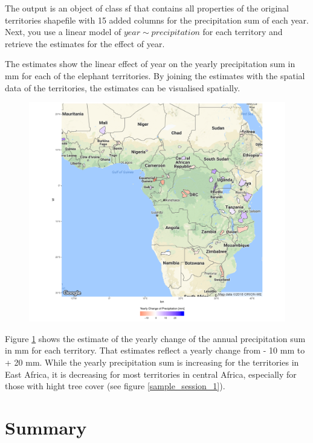 The output is an object of class sf that contains all properties of the original territories shapefile with 15 added columns for the precipitation sum of each year.
Next, you use a linear model of $year  \sim precipitation$ for each territory and retrieve the estimates for the effect of year. 

The estimates show the linear effect of year on the yearly precipitation sum in mm for each of the elephant territories. 
By joining the estimates with the spatial data of the territories, the estimates can be visualised spatially. 

\begin{center}
	\begin{figure}[h]
		\begin{center}
			\includegraphics[width=16cm]{images/change_precipitation.pdf}
			\label{change}
		\end{center}
	\end{figure}
\end{center}


Figure \ref{change} shows the estimate of the yearly change of the annual precipitation sum in mm for each territory. That estimates reflect a yearly change from - 10 mm to + 20 mm. While the yearly precipitation sum is increasing for the territories in East Africa, it is decreasing for most territories in central Africa, especially for those with hight tree cover (see figure \ref*{sample_session_1}).


\section{Summary}

